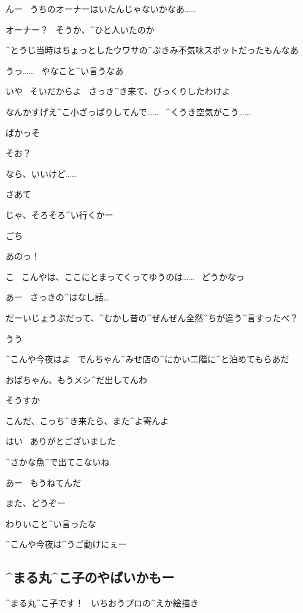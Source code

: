 \Alpha んー
\ うちのオーナーはいたんじゃないかなあ……

\Ayase オーナー？
\ そうか、^{ひと}{人}いたのか

\page[161]
\Ayase ^{とうじ}{当時}はちょっとしたウワサの^{ぶきみ}{不気味}スポットだったもんなあ

\Alpha うっ……
\ やなこと^{い}{言}うなあ

\Ayase いや
\ そいだからよ
\ さっき^{き}{来}て、びっくりしたわけよ

\Ayase なんかすげえ^{こ}{小}ざっぱりしてんで……
\ ^{くうき}{空気}がこう……

\Ayase ぱかっそ

\Alpha そお？

\Alpha なら、いいけど……

\page[162]
\Ayase さあて

\Ayase じゃ、そろそろ^{い}{行}くかー

\Ayase ごち

\Alpha あのっ！

\Alpha こ
\ こんやは、ここにとまってくってゆうのは……
\ どうかなっ

\Ayase あー
\ さっきの^{はなし}{話}…

\page[163]
\Ayase だーいじょうぶだって、^{むかし}{昔}の^{ぜんぜん}{全然}^{ちが}{違}う^{言}{す}ったべ？

\Alpha うう

\Ayase ^{こんや}{今夜}はよ
\ でんちゃん^{みせ}{店}の^{にかい}{二階}に^{と}{泊}めてもらあだ

\Ayase おばちゃん、もうメシ^{だ}{出}してんわ

\Alpha そうすか

\Ayase こんだ、こっち^{き}{来}たら、また^{よ}{寄}んよ

\Alpha はい
\ ありがとございました

\page[164]
\Alpha ^{さかな}{魚}^{で}{出}てこないね

\Ayase あー
\ もうねてんだ

\Alpha また、どうぞー

\page[165]
\Ayase わりいこと^{い}{言}ったな

\page[167]
\Alpha ^{こんや}{今夜}は^{うご}{動}けにぇー


\subsection{^{まる}{丸}^{こ}{子}のやばいかもー}
\Maruko ^{まる}{丸}^{こ}{子}です！
\ いちおうプロの^{えか}{絵描}き

